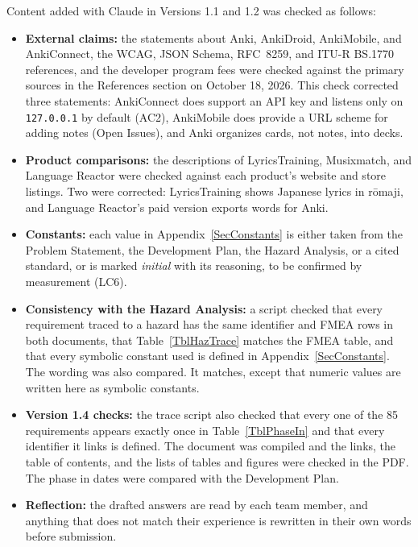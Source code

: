 \documentclass[12pt]{article}
\begin{document}
Content added with Claude in Versions 1.1 and 1.2 was checked as follows:
\begin{itemize}
    \item \textbf{External claims:} the statements about Anki, AnkiDroid,
          AnkiMobile, and AnkiConnect, the WCAG, JSON Schema, RFC~8259, and
          ITU-R BS.1770 references, and the developer program fees were
          checked against the primary sources in the References section on
          October 18, 2026. This check corrected three statements: AnkiConnect
          does support an API key and listens only on \texttt{127.0.0.1} by
          default (AC2), AnkiMobile does provide a URL scheme for adding notes
          (Open Issues), and Anki organizes cards, not notes, into decks.
    \item \textbf{Product comparisons:} the descriptions of LyricsTraining,
          Musixmatch, and Language Reactor were checked against each product's
          website and store listings. Two were corrected: LyricsTraining shows
          Japanese lyrics in r\=omaji, and Language Reactor's paid version
          exports words for Anki.
    \item \textbf{Constants:} each value in Appendix~\ref{SecConstants} is
          either taken from the Problem Statement, the Development Plan, the
          Hazard Analysis, or a cited standard, or is marked \emph{initial}
          with its reasoning, to be confirmed by measurement (LC6).
    \item \textbf{Consistency with the Hazard Analysis:} a script checked
          that every requirement traced to a hazard has the same identifier
          and FMEA rows in both documents, that Table~\ref{TblHazTrace}
          matches the FMEA table, and that every symbolic constant used is
          defined in Appendix~\ref{SecConstants}. The wording was also
          compared. It matches, except that numeric values are written here as
          symbolic constants.
    \item \textbf{Version 1.4 checks:} the trace script also checked that
          every one of the 85 requirements appears exactly once in
          Table~\ref{TblPhaseIn} and that every identifier it links is
          defined. The document was compiled and the links, the table of
          contents, and the lists of tables and figures were checked in the
          PDF. The phase in dates were compared with the Development Plan.
    \item \textbf{Reflection:} the drafted answers are read by each team
          member, and anything that does not match their experience is
          rewritten in their own words before submission.
\end{itemize}
\end{document}
